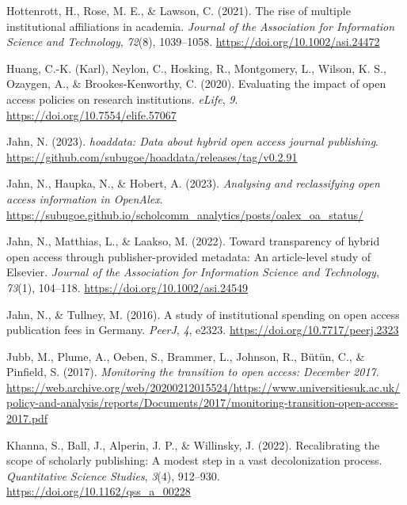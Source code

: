 \documentclass[a4paper,man,floatsintext,longtable,noextraspace,12pt]{apa6}
\newenvironment{CSLReferences}%
  {}%
  {\par}
\begin{document}
\begin{CSLReferences}{1}{0}
\leavevmode{}%
Hottenrott, H., Rose, M. E., \& Lawson, C. (2021). The rise of multiple
institutional affiliations in academia. \emph{Journal of the Association
for Information Science and Technology}, \emph{72}(8), 1039--1058.
\url{https://doi.org/10.1002/asi.24472}

\leavevmode{}%
Huang, C.-K. (Karl), Neylon, C., Hosking, R., Montgomery, L., Wilson, K.
S., Ozaygen, A., \& Brookes-Kenworthy, C. (2020). Evaluating the impact
of open access policies on research institutions. \emph{{eLife}},
\emph{9}. \url{https://doi.org/10.7554/elife.57067}

\leavevmode{}%
Jahn, N. (2023). \emph{{hoaddata}: Data about hybrid open access journal
publishing}.
\url{https://github.com/subugoe/hoaddata/releases/tag/v0.2.91}

\leavevmode{}%
Jahn, N., Haupka, N., \& Hobert, A. (2023). \emph{Analysing and
reclassifying open access information in OpenAlex}.
\url{https://subugoe.github.io/scholcomm_analytics/posts/oalex_oa_status/}

\leavevmode{}%
Jahn, N., Matthias, L., \& Laakso, M. (2022). Toward transparency of
hybrid open access through publisher-provided metadata: An article-level
study of {Elsevier}. \emph{Journal of the Association for Information
Science and Technology}, \emph{73}(1), 104--118.
\url{https://doi.org/10.1002/asi.24549}

\leavevmode{}%
Jahn, N., \& Tullney, M. (2016). A study of institutional spending on
open access publication fees in {Germany}. \emph{{PeerJ}}, \emph{4},
e2323. \url{https://doi.org/10.7717/peerj.2323}

\leavevmode{}%
Jubb, M., Plume, A., Oeben, S., Brammer, L., Johnson, R., Bütün, C., \&
Pinfield, S. (2017). \emph{Monitoring the transition to open access:
December 2017}.
\url{https://web.archive.org/web/20200212015524/https://www.universitiesuk.ac.uk/policy-and-analysis/reports/Documents/2017/monitoring-transition-open-access-2017.pdf}

\leavevmode{}%
Khanna, S., Ball, J., Alperin, J. P., \& Willinsky, J. (2022).
Recalibrating the scope of scholarly publishing: A modest step in a vast
decolonization process. \emph{Quantitative Science Studies},
\emph{3}(4), 912--930. \url{https://doi.org/10.1162/qss_a_00228}


\end{CSLReferences}
\end{document}
